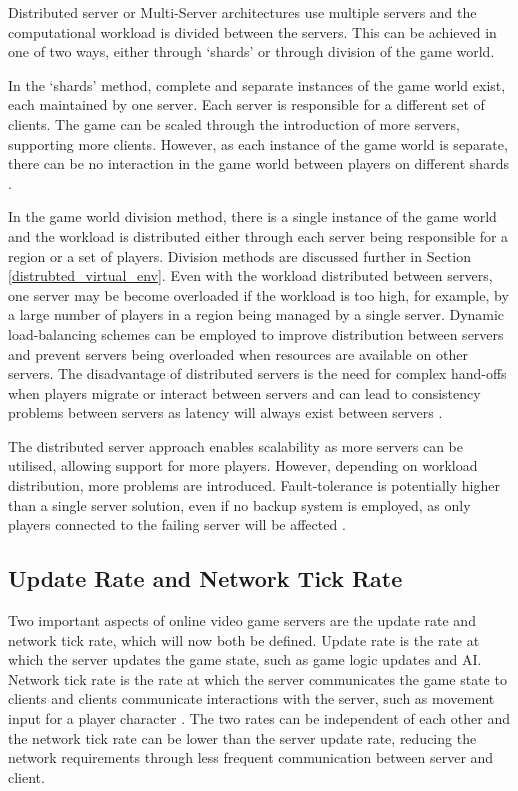 Distributed server or Multi-Server architectures use multiple servers and the computational workload is divided between the servers. This can be achieved in one of two ways, either through `shards' or through division of the game world. 

In the `shards' method, complete and separate instances of the game world exist, each maintained by one server. Each server is responsible for a different set of clients. The game can be scaled through the introduction of more servers, supporting more clients. However, as each instance of the game world is separate, there can be no interaction in the game world between players on different shards \cite{P2PForMMOs}.

In the game world division method, there is a single instance of the game world and the workload is distributed either through each server being responsible for a region or a set of players. Division methods are discussed further in Section \ref{distrubted_virtual_env}. Even with the workload distributed between servers, one server may be become overloaded if the workload is too high, for example, by a large number of players in a region being managed by a single server. Dynamic load-balancing schemes can be employed to improve distribution between servers and prevent servers being overloaded when resources are available on other servers. The disadvantage of distributed servers is the need for complex hand-offs when players migrate or interact between servers and can lead to consistency problems between servers as latency will always exist between servers \cite{P2PForMMOs}.

The distributed server approach enables scalability as more servers can be utilised, allowing support for more players. However, depending on workload distribution, more problems are introduced. Fault-tolerance is potentially higher than a single server solution, even if no backup system is employed, as only players connected to the failing server will be affected \cite{P2PForMMOs}.


\subsection{Update Rate and Network Tick Rate} \label{update-rate-test-values}

Two important aspects of online video game servers are the update rate and network tick rate, which will now both be defined. Update rate is the rate at which the server updates the game state, such as game logic updates and AI. Network tick rate is the rate at which the server communicates the game state to clients and clients communicate interactions with the server, such as movement input for a player character \cite{pisan2004challenges}. The two rates can be independent of each other and the network tick rate can be lower than the server update rate, reducing the network requirements through less frequent communication between server and client.

